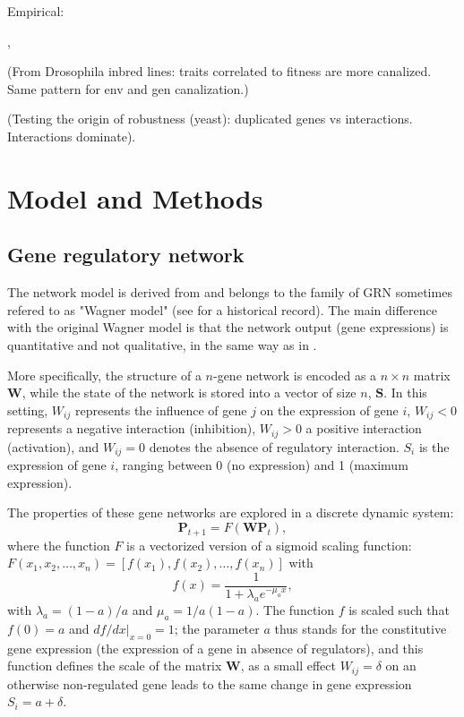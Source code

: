 \documentclass[a4paper]{article}
\begin{document}
Empirical: 

\citep{CMG+06}, 

\citep{Sch91}

\citep{SKK95} (From Drosophila inbred lines: traits correlated to fitness are more canalized. Same pattern for env and gen canalization.)

\citep{Wag00} (Testing the origin of robustness (yeast): duplicated genes vs interactions. Interactions dominate). 

\section{Model and Methods}

\subsection{Gene regulatory network}

The network model is derived from \cite{Wag94,Wag96} and belongs to the family of GRN sometimes refered to as "Wagner model" (see \citet{FP15} for a historical record). The main difference with the original Wagner model is that the network output (gene expressions) is quantitative and not qualitative, in the same way as in \cite{SB02}. 

More specifically, the structure of a $n$-gene network is encoded as a $n\times n$ matrix $\bm W$, while the state of the network is stored into a vector of size $n$, $\bm S$. In this setting, $W_{ij}$ represents the influence of gene $j$ on the expression of gene $i$, $W_{ij} < 0$ represents a negative interaction (inhibition), $W_{ij} > 0$ a positive interaction (activation), and $W_{ij} = 0$ denotes the absence of regulatory interaction. $S_i$ is the expression of gene $i$, ranging between 0 (no expression) and 1 (maximum expression). 

The properties of these gene networks are explored in a discrete dynamic system:
\begin{equation}
 \bm P_{t+1} = F(\bm W \bm P_t),
\end{equation}
\noindent where the function $F$ is a vectorized version of a sigmoid scaling function: $F(x_1, x_2, \dots, x_n) = [f(x_1), f(x_2), \dots, f(x_n)]$ with
\begin{equation} \label{eq:fx}
f(x) = \frac{1}{1+ \lambda_a e ^{- \mu_a x}}, 
\end{equation}
\noindent with $\lambda_a = (1-a)/a$ and $\mu_a = 1/a(1-a)$. The function $f$ is scaled such that $f(0) = a$ and $df/dx|_{x=0}=1$; the parameter $a$ thus stands for the constitutive gene expression (the expression of a gene in absence of regulators), and this function defines the scale of the matrix $\bm W$, as a small effect $W_{ij} = \delta$ on an otherwise non-regulated gene leads to the same change in gene expression $S_i = a+\delta$. 
\end{document}
